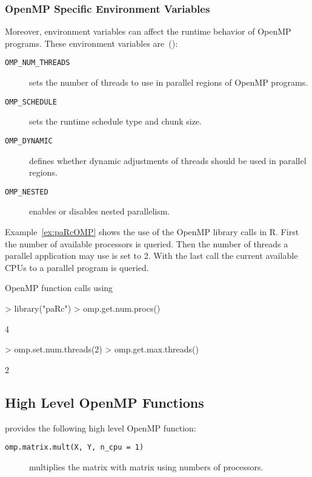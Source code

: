 \subsubsection{OpenMP Specific Environment Variables}

Moreover, environment variables can affect the runtime behavior of
OpenMP programs. These environment variables are~(\cite{openMP05}):

\begin{description}
\item[\texttt{OMP\_NUM\_THREADS}] sets the number of threads to use in
  parallel regions of OpenMP programs. 
\item[\texttt{OMP\_SCHEDULE}] sets the runtime schedule type and
  chunk size.
\item[\texttt{OMP\_DYNAMIC}] defines whether dynamic adjustments of threads
  should be used in parallel regions.
\item[\texttt{OMP\_NESTED}] enables or disables nested parallelism.
\end{description}

Example~\ref{ex:paRcOMP} shows the use of the OpenMP library calls in
R. First the number of available processors is queried. Then the
number of threads a parallel application may use is set to 2. With the
last call the current available CPUs to a parallel program is queried.
\begin{Example} OpenMP function calls using 
\label{ex:paRcOMP}
\begin{Schunk}
\begin{Sinput}
> library("paRc")
> omp.get.num.procs()
\end{Sinput}
\begin{Soutput}
[1] 4
\end{Soutput}
\begin{Sinput}
> omp.set.num.threads(2)
> omp.get.max.threads()
\end{Sinput}
\begin{Soutput}
[1] 2
\end{Soutput}
\end{Schunk}
\end{Example}

\subsection{High Level OpenMP Functions}

 provides the following high level OpenMP function: 

\begin{description}
\item[\texttt{omp.matrix.mult(X, Y, n\_cpu = 1)}] multiplies the matrix
   with matrix  using  numbers of
  processors.
\end{description}


